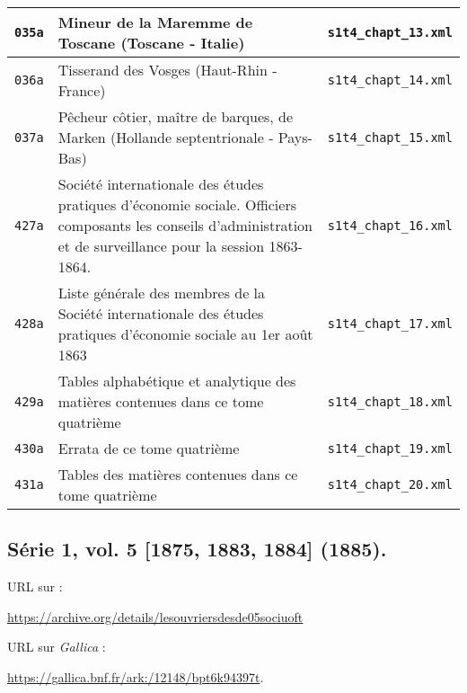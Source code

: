 \begin{center}
\begin{longtable}{ | c | p{9.5cm} | c | }
\texttt{035a} & Mineur de la Maremme de Toscane (Toscane - Italie) & \texttt{s1t4\_chapt\_13.xml} \\ \hline
\texttt{036a} & Tisserand des Vosges (Haut-Rhin - France) & \texttt{s1t4\_chapt\_14.xml} \\ \hline
\texttt{037a} & Pêcheur côtier, maître de barques, de Marken (Hollande septentrionale - Pays-Bas) & \texttt{s1t4\_chapt\_15.xml} \\ \hline
\texttt{427a} & Société internationale des études pratiques d'économie sociale. Officiers composants les conseils d'administration et de surveillance pour la session 1863-1864. & \texttt{s1t4\_chapt\_16.xml} \\ \hline
\texttt{428a} & Liste générale des membres de la Société internationale des études pratiques d'économie sociale au 1er août 1863 & \texttt{s1t4\_chapt\_17.xml} \\ \hline
\texttt{429a} & Tables alphabétique et analytique des matières contenues dans ce tome quatrième & \texttt{s1t4\_chapt\_18.xml} \\ \hline
\texttt{430a} & Errata de ce tome quatrième & \texttt{s1t4\_chapt\_19.xml} \\ \hline
\texttt{431a} & Tables des matières contenues dans ce tome quatrième & \texttt{s1t4\_chapt\_20.xml} \\ \hline
\end{longtable}
\end{center}

\subsection{Série 1, vol. 5 [1875, 1883, 1884] (1885).}
\label{mappings1t5}

URL sur \ia{} : 

\url{https://archive.org/details/lesouvriersdesde05sociuoft}

URL sur \textit{Gallica} : 

\url{https://gallica.bnf.fr/ark:/12148/bpt6k94397t}.

